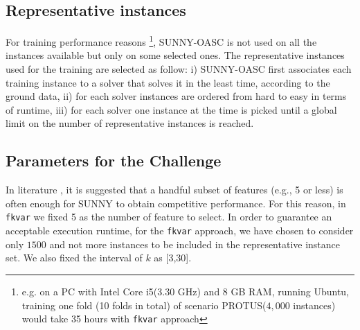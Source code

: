 \documentclass[tablecaption=bottom,wcp]{jmlr} %
\newcommand{\TODO}[1]{\textcolor{red}{#1}}
\begin{document}
\subsection{Representative instances}
For training performance reasons \footnote{e.g. on a PC with Intel Core i5(3.30 GHz) and 8 GB RAM, running Ubuntu, training one fold (10 folds in total) of scenario PROTUS($4,000$ instances) would take 35 hours with \texttt{fkvar} approach}, SUNNY-OASC is not used on all the instances available 
but only on some selected ones.
The representative instances used for the training are selected as follow: i) 
SUNNY-OASC first associates each training instance to a solver that solves it in the 
least time, according to the ground data, ii) for each solver instances are ordered from hard to easy in terms 
of runtime, iii) for each solver one instance at the time is picked until a 
global limit on the number of representative instances is reached.

\subsection{Parameters for the Challenge}
In literature \cite{bischl2016aslib,ictai_paper}, it is suggested that a handful subset 
of features (e.g., 5 or less) is often enough for SUNNY to obtain  
competitive performance. For this reason, in \texttt{fkvar} we fixed 
5 as the number of feature to select. In order to guarantee an acceptable 
execution runtime, for the \texttt{fkvar} approach, we have chosen to 
consider only $1500$ and not more instances to be included in the 
representative instance set. We also fixed the interval of $k$ as [3,30]. 


\end{document}

